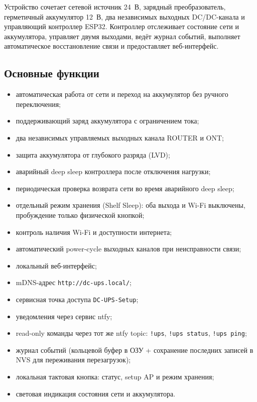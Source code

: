 \documentclass[11pt,a4paper]{article}
\begin{document}
Устройство сочетает сетевой источник 24~В, зарядный преобразователь, герметичный аккумулятор 12~В, два независимых выходных DC/DC-канала и управляющий контроллер ESP32. Контроллер отслеживает состояние сети и аккумулятора, управляет двумя выходами, ведёт журнал событий, выполняет автоматическое восстановление связи и предоставляет веб-интерфейс.

\subsection{Основные функции}
\begin{itemize}[leftmargin=7mm]
  \item автоматическая работа от сети и переход на аккумулятор без ручного переключения;
  \item поддерживающий заряд аккумулятора с ограничением тока;
  \item два независимых управляемых выходных канала ROUTER и ONT;
  \item защита аккумулятора от глубокого разряда (LVD);
  \item аварийный deep sleep контроллера после отключения нагрузки;
  \item периодическая проверка возврата сети во время аварийного deep sleep;
  \item отдельный режим хранения (Shelf Sleep): оба выхода и Wi-Fi выключены, пробуждение только физической кнопкой;
  \item контроль наличия Wi-Fi и доступности интернета;
  \item автоматический power-cycle выходных каналов при неисправности связи;
  \item локальный веб-интерфейс;
  \item mDNS-адрес \texttt{http://dc-ups.local/};
  \item сервисная точка доступа \texttt{DC-UPS-Setup};
  \item уведомления через сервис ntfy;
  \item read-only команды через тот же ntfy topic: \texttt{!ups}, \texttt{!ups status}, \texttt{!ups ping};
  \item журнал событий (кольцевой буфер в ОЗУ + сохранение последних записей в NVS для переживания перезагрузок);
  \item локальная тактовая кнопка: статус, setup AP и режим хранения;
  \item световая индикация состояния сети и аккумулятора.
\end{itemize}
\end{document}
